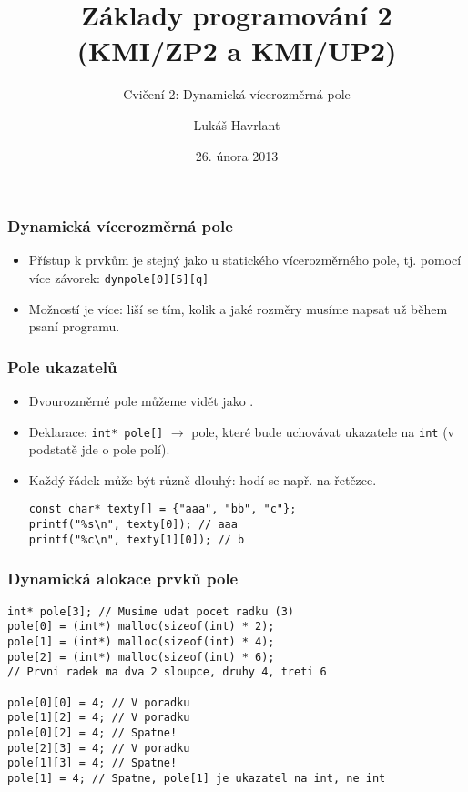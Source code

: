 \documentclass{beamer}
\title{Základy programování 2 (KMI/ZP2 a KMI/UP2)}
\subtitle{Cvičení 2: Dynamická vícerozměrná pole}
\author{Lukáš Havrlant}
\date{26. února 2013}
\institute{Univerzita Palackého}
\newenvironment{itemizex}%
  {\large \begin{itemize}%
    \setlength{\itemsep}{8pt}%
    \setlength{\parskip}{8pt}}%
  {\end{itemize}}
\begin{document}
\begin{frame}[t,plain]
\titlepage
\end{frame}


\begin{frame}[t,fragile]\frametitle{Dynamická vícerozměrná pole}
    \vskip 1cm
    \begin{itemizex}
        \item Přístup k prvkům je stejný jako u statického vícerozměrného pole, tj. pomocí více závorek: \texttt{dynpole[0][5][q]}
        \item Možností je více: liší se tím, kolik a jaké rozměry musíme napsat už během psaní programu.
    \end{itemizex}
\end{frame}


\begin{frame}[t,fragile]\frametitle{Pole ukazatelů} 
    \begin{itemizex}
        \item Dvourozměrné pole můžeme vidět jako .
        \item Deklarace: \texttt{int* pole[]} $\rightarrow$ pole, které bude uchovávat ukazatele na \texttt{int} (v podstatě jde o pole polí).
        \item Každý řádek může být různě dlouhý: hodí se např. na řetězce. 
\begin{verbatim} 
const char* texty[] = {"aaa", "bb", "c"};
printf("%s\n", texty[0]); // aaa
printf("%c\n", texty[1][0]); // b
\end{verbatim}
    \end{itemizex}
\end{frame}


\begin{frame}[t,fragile]\frametitle{Dynamická alokace prvků pole} 
\begin{verbatim} 
int* pole[3]; // Musime udat pocet radku (3)
pole[0] = (int*) malloc(sizeof(int) * 2);
pole[1] = (int*) malloc(sizeof(int) * 4);
pole[2] = (int*) malloc(sizeof(int) * 6);
// Prvni radek ma dva 2 sloupce, druhy 4, treti 6

pole[0][0] = 4; // V poradku
pole[1][2] = 4; // V poradku
pole[0][2] = 4; // Spatne! 
pole[2][3] = 4; // V poradku
pole[1][3] = 4; // Spatne!
pole[1] = 4; // Spatne, pole[1] je ukazatel na int, ne int
\end{verbatim}
\end{frame}
\end{document}
